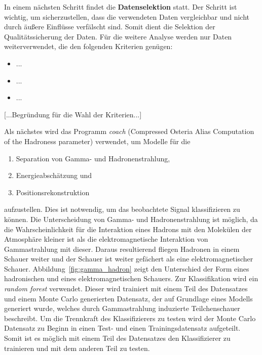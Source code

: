 In einem nächsten Schritt findet die \textbf{Datenselektion} statt. Der Schritt
ist wichtig, um sicherzustellen, dass die verwendeten Daten vergleichbar und
nicht durch äußere Einflüsse verfälscht sind. Somit dient die Selektion der
Qualitätssicherung der Daten. Für die weitere Analyse werden nur Daten
weiterverwendet, die den folgenden Kriterien genügen:
\begin{itemize}
  \item ...
  \item ...
  \item ...
\end{itemize}
[...Begründung für die Wahl der Kriterien...]

Als nächstes wird das Programm \textit{coach} (Compressed Osteria Alias
Computation of the Hadroness parameter) verwendet, um Modelle für die
\begin{enumerate}
  \item Separation von Gamma- und Hadronenstrahlung,
  \item Energieabschätzung und
  \item Positionsrekonstruktion
\end{enumerate}
aufzustellen. Dies ist notwendig, um das beobachtete Signal klassifizieren zu
können. Die Unterscheidung von Gamma- und Hadronenstrahlung ist möglich, da die
Wahrscheinlichkeit für die Interaktion eines Hadrons mit den Molekülen der
Atmosphäre kleiner ist als die elektromagnetische Interaktion von Gammastrahlung
mit dieser. Daraus resultierend fliegen Hadronen in einem Schauer weiter und der
Schauer ist weiter gefächert als eine elektromagnetischer Schauer.
Abbildung~\ref{fig:gamma_hadron} zeigt den Unterschied der Form eines
hadronischen und eines elektromagnetischen Schauers. Zur Klassifikation wird ein
\textit{random forest} verwendet. Dieser wird trainiert mit einem Teil des
Datensatzes und einem Monte Carlo generierten Datensatz, der auf Grundlage eines
Modells generiert wurde, welches durch Gammastrahlung induzierte Teilchenschauer
beschreibt. Um die Trennkraft des Klassifizierers zu testen wird der Monte
Carlo Datensatz zu Beginn in einen Test- und einen Trainingsdatensatz
aufgeteilt. Somit ist es möglich mit einem Teil des Datensatzes den
Klassifizierer zu trainieren und mit dem anderen Teil zu testen.

